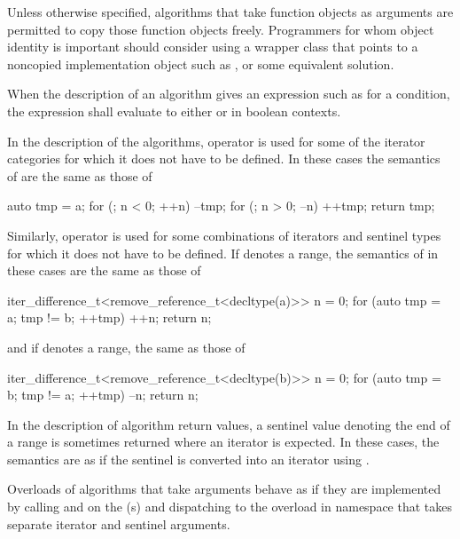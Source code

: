 \pnum
\begin{note}
Unless otherwise specified, algorithms that take function objects as arguments
are permitted to copy those function objects freely. Programmers for whom object
identity is important should consider using a wrapper class that points to a
noncopied implementation object such as , or some equivalent solution.
\end{note}

\pnum
When the description of an algorithm gives an expression such as
for a condition, the expression shall evaluate to
either  or  in boolean contexts.

\pnum
In the description of the algorithms, operator \tcode{+}
is used for some of the iterator categories for which
it does not have to be defined.
In these cases the semantics of
are the same as those of
\begin{codeblock}
auto tmp = a;
for (; n < 0; ++n) --tmp;
for (; n > 0; --n) ++tmp;
return tmp;
\end{codeblock}
Similarly, operator \tcode{-} is used for some
combinations of iterators and sentinel types for which
it does not have to be defined. If  denotes a range,
the semantics of  in these cases are the same as those of
\begin{codeblock}
iter_difference_t<remove_reference_t<decltype(a)>> n = 0;
for (auto tmp = a; tmp != b; ++tmp) ++n;
return n;
\end{codeblock}
and if  denotes a range, the same as those of
\begin{codeblock}
iter_difference_t<remove_reference_t<decltype(b)>> n = 0;
for (auto tmp = b; tmp != a; ++tmp) --n;
return n;
\end{codeblock}

\pnum
In the description of algorithm return values, a sentinel value 
denoting the end of a range  is sometimes
returned where an iterator is expected. In these cases, the semantics are as
if the sentinel is converted into an iterator using
.

\pnum
Overloads of algorithms that take  arguments
behave as if they are implemented by calling  and
 on the (s) and dispatching
to the overload in namespace  that takes
separate iterator and sentinel arguments.

